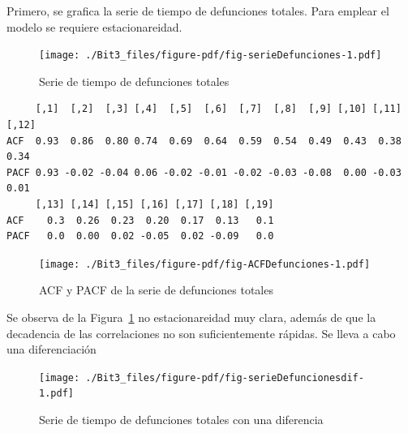 \documentclass[
  letterpaper,
  onepage,
  openany]{report}
\newenvironment{Shaded}{\begin{snugshade}}{\end{snugshade}}
\newcommand{\AttributeTok}[1]{\textcolor[rgb]{0.40,0.45,0.13}{#1}}
\newcommand{\DecValTok}[1]{\textcolor[rgb]{0.68,0.00,0.00}{#1}}
\newcommand{\FunctionTok}[1]{\textcolor[rgb]{0.28,0.35,0.67}{#1}}
\newcommand{\NormalTok}[1]{\textcolor[rgb]{0.00,0.23,0.31}{#1}}
\newcommand{\OtherTok}[1]{\textcolor[rgb]{0.00,0.23,0.31}{#1}}
\newcommand{\SpecialCharTok}[1]{\textcolor[rgb]{0.37,0.37,0.37}{#1}}
\begin{document}
\begin{Shaded}
\end{Shaded}

Primero, se grafica la serie de tiempo de defunciones totales. Para
emplear el modelo se requiere estacionareidad.

\begin{figure}[H]

{\centering \texttt{[image: ./Bit3\_files/figure-pdf/fig-serieDefunciones-1.pdf]}

}

\caption{\label{fig-serieDefunciones}Serie de tiempo de defunciones
totales}

\end{figure}

\begin{verbatim}
     [,1]  [,2]  [,3] [,4]  [,5]  [,6]  [,7]  [,8]  [,9] [,10] [,11] [,12]
ACF  0.93  0.86  0.80 0.74  0.69  0.64  0.59  0.54  0.49  0.43  0.38  0.34
PACF 0.93 -0.02 -0.04 0.06 -0.02 -0.01 -0.02 -0.03 -0.08  0.00 -0.03  0.01
     [,13] [,14] [,15] [,16] [,17] [,18] [,19]
ACF    0.3  0.26  0.23  0.20  0.17  0.13   0.1
PACF   0.0  0.00  0.02 -0.05  0.02 -0.09   0.0
\end{verbatim}

\begin{figure}[H]

{\centering \texttt{[image: ./Bit3\_files/figure-pdf/fig-ACFDefunciones-1.pdf]}

}

\caption{\label{fig-ACFDefunciones}ACF y PACF de la serie de defunciones
totales}

\end{figure}

Se observa de la Figura~\ref{fig-serieDefunciones} no estacionareidad
muy clara, además de que la decadencia de las correlaciones no son
suficientemente rápidas. Se lleva a cabo una diferenciación

\begin{figure}[H]

{\centering \texttt{[image: ./Bit3\_files/figure-pdf/fig-serieDefuncionesdif-1.pdf]}

}

\caption{\label{fig-serieDefuncionesdif}Serie de tiempo de defunciones
totales con una diferencia}

\end{figure}
\end{document}
